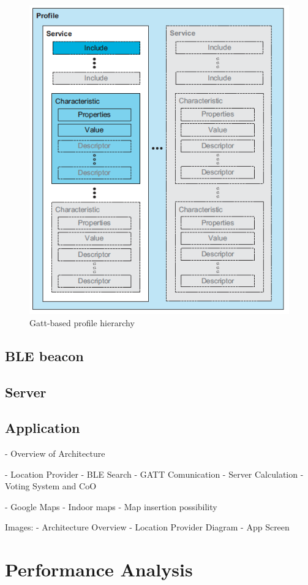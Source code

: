 \documentclass[a4paper]{IEEEtran}
\begin{document}
\begin{figure}
	\centering
		\includegraphics[width=0.5\linewidth]{figures/profile.png}
	\caption[Gatt-based profile hierarchy]{Gatt-based profile hierarchy}
	\label{fig:architecture}
\end{figure}

\subsection{ BLE beacon}
\label{subsec:beacon}

\subsection{ Server}
\label{subsec:beacon}

\subsection{ Application}
\label{subsec:beacon}



- Overview of Architecture

- Location Provider
	- BLE Search
	- GATT Comunication
	- Server Calculation
	- Voting System  and CoO

- Google Maps
	- Indoor maps 
	- Map insertion possibility

Images:
	- Architecture Overview
	- Location Provider Diagram
	- App Screen



\section{Performance Analysis}
\label{sec:performance}
 
\end{document}
